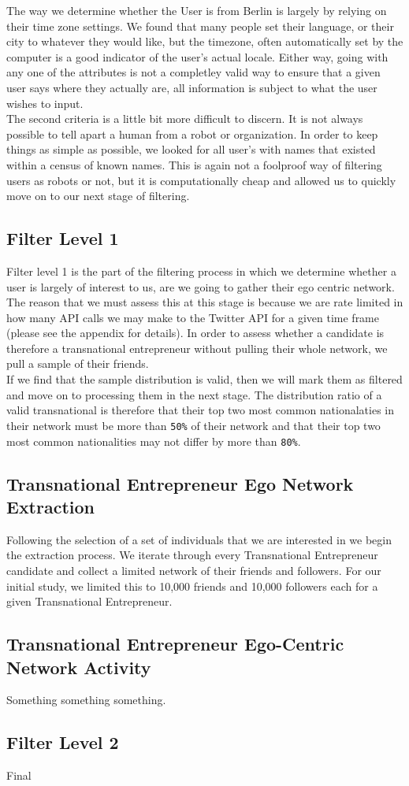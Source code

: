 The way we determine whether the User is from Berlin is largely by relying on their time zone settings. We found that many people set their language, or their city to whatever they would like, but the timezone, often automatically set by the computer is a good indicator of the user's actual locale. Either way, going with any one of the attributes is not a completley valid way to ensure that a given user says where they actually are, all information is subject to what the user wishes to input.
\\
The second criteria is a little bit more difficult to discern. It is not always possible to tell apart a human from a robot or organization. In order to keep things as simple as possible, we looked for all user's with names that existed within a census of known names. This is again not a foolproof way of filtering users as robots or not, but it is computationally cheap and allowed us to quickly move on to our next stage of filtering.

\subsection{Filter Level 1}
Filter level 1 is the part of the filtering process in which we determine whether a user is largely of interest to us, are we going to gather their ego centric network. The reason that we must assess this at this stage is because we are rate limited in how many API calls we may make to the Twitter API for a given time frame (please see the appendix for details). In order to assess whether a candidate is therefore a transnational entrepreneur without pulling their whole network, we pull a sample of their friends.
\\
If we find that the sample distribution is valid, then we will mark them as filtered and move on to processing them in the next stage. The distribution ratio of a valid transnational is therefore that their top two most common nationalaties in their network must be more than \verb|50%| of their network and that their top two most common nationalities may not differ by more than \verb|80%|.

\subsection{Transnational Entrepreneur Ego Network Extraction}
Following the selection of a set of individuals that we are interested in we begin the extraction process. We iterate through every Transnational Entrepreneur candidate and collect a limited network of their friends and followers. For our initial study, we limited this to 10,000 friends and 10,000 followers each for a given Transnational Entrepreneur.

\subsection{Transnational Entrepreneur Ego-Centric Network Activity}
Something something something.

\subsection{Filter Level 2}
Final